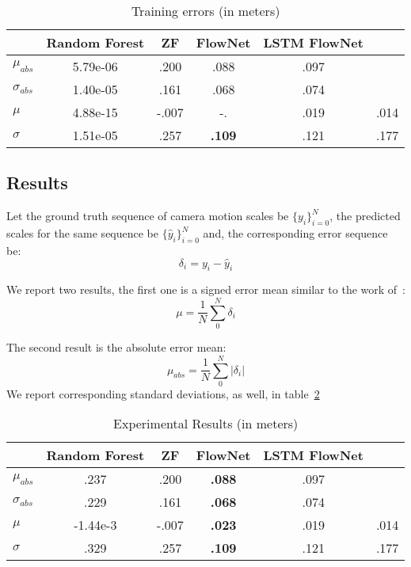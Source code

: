 \begin{table}[ht]
  \centering
  \begin{tabular}{ lccccc }
    \hline
                       & Random Forest & ZF   & FlowNet          & LSTM FlowNet & \cite{frost2016}   \\
    \hline
    $\mu_{abs}$        & 5.79e-06      & .200 & .088    & .097  & \\
    $\sigma_{abs}$     & 1.40e-05      & .161 & .068    & .074  & \\
    $\mu$              & 4.88e-15      &-.007 & -.    & .019  & .014\\
    $\sigma$           & 1.51e-05      & .257 & \textbf{.109}    & .121  & .177\\
    \hline
  \end{tabular}
  \caption{Training errors (in meters)}
  \label{table:train result}
\end{table}

\subsection{Results}\label{sec:results}

Let the ground truth sequence of camera motion scales be
$\{y_i\}_{i=0}^N$, the predicted scales for the same sequence be
$\{\hat{y}_i\}_{i=0}^N$ and, the corresponding error sequence be:
\begin{equation}
  \delta_i = y_i-\hat{y}_i
\end{equation}

We report two results, the first one is a signed error mean similar to
the work of~\cite{frost2016}:
\begin{equation}
  \mu = \frac{1}{N}\sum_0^N{\delta_i}
\end{equation}

The second result is the absolute error mean:
\begin{equation}
  \mu_{abs} = \frac{1}{N}\sum_0^N{|\delta_i|}
\end{equation}
We report corresponding standard deviations, as well, in table~\ref{table:main result}

\begin{table}[ht]
  \centering
  \begin{tabular}{ lccccc }
    \hline
                       & Random Forest & ZF   & FlowNet          & LSTM FlowNet & \cite{frost2016}   \\
    \hline
    $\mu_{abs}$        & .237          & .200 & \textbf{.088}    & .097  & \\
    $\sigma_{abs}$     & .229          & .161 & \textbf{.068}    & .074  & \\
    $\mu$              & -1.44e-3      &-.007 & \textbf{.023}    & .019  & .014\\
    $\sigma$           & .329          & .257 & \textbf{.109}    & .121  & .177\\
    \hline
  \end{tabular}
  \caption{Experimental Results (in meters)}
  \label{table:main result}
\end{table}

